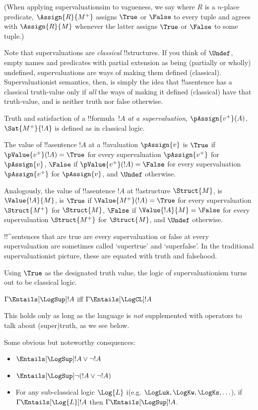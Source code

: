 \documentclass[../../../include/open-logic-section]{subfiles}
\begin{document}
(When applying supervaluationsim to vagueness, we say where $R$ is a $n$-place predicate, $\Assign{R}{M^+}$ assigns $\True$ or $\False$ to every tuple and agrees with $\Assign{R}{M}$ whenever the latter assigns $\True$ or $\False$ to some tuple.)

Note that supervaluations are \emph{classical} !!{structure}s. If you think of $\Undef$, empty names and predicates with partial extension as being (partially or wholly) undefined, supervaluations are ways of making them defined (classical). Supervaluationist semantics, then, is simply the idea that !!a{sentence} has a classical truth-value only if \emph{all} the ways of making it defined (classical) have that truth-value, and is neither truth nor false otherwise.

\begin{defn}
Truth and satisfaction of a !!{formula}~$!A$ \emph{at a supervaluation}, $\pAssign{v^+}(A)$, $\Sat{M^+}{!A}$ is defined as in classical logic.

The value of !!a{sentence} $!A$ at a !!a{valuation} $\pAssign{v}$ is $\True$ if $\pValue{v^+}(!A) = \True$ for every supervaluation $\pAssign{v^+}$ for $\pAssign{v}$, $\False$ if $\pValue{v^+}(!A) = \False$ for every supervaluation $\pAssign{v^+}$ for $\pAssign{v}$, and $\Undef$ otherwise.

Analogously, the value of !!a{sentence} $!A$ at !!a{structure} $\Struct{M}$,  is $\Value{!A}{M}$, is $\True$ if $\Value{M^+}(!A) = \True$ for every supervaluation $\Struct{M^+}$ for $\Struct{M}$, $\False$ if $\Value{!A}{M} = \False$ for every supervaluation $\Struct{M^+}$ for $\Struct{M}$, and $\Undef$ otherwise.
\end{defn}

!!^{sentence}s that are true are every supervaluation or false at every supervaluation are sometimes called `supertrue' and `superfalse'. In the traditional supervaluationist picture, these are equated with truth and falsehood. 

Using $\True$ as the designated truth value, the logic of supervaluationism turns out to be classical logic.

\begin{prop}
$\Gamma \Entails[\LogSup] !A$ iff $\Gamma \Entails[\LogCL] !A$
\end{prop}

This holds only as long as the language is \emph{not} supplemented with operators to talk about (super)truth, as we see below.

Some obvious but noteworthy consquences:

\begin{prop}
\begin{itemize}
	\item $\Entails[\LogSup] !A \lor \lnot !A$
	\item $\Entails[\LogSup] \lnot (!A \lor \lnot !A)$
	\item For any sub-classical logic $\Log{L}$ i(e.g. $\LogLuk, \LogKw, \LogKs, \ldots$), if $\Gamma \Entails[\Log{L}] !A$ then $\Gamma \Entails[\LogSup] !A$.
\end{itemize}
\end{prop}
	
\end{document}
